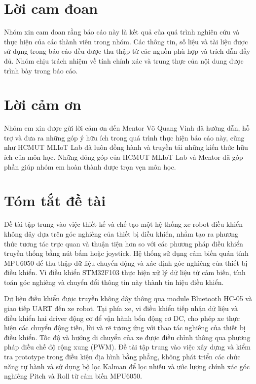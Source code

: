 \let\temp\cleardoublepage
\renewcommand{\cleardoublepage}{\clearpage}
{}
\chapter*{Lời cam đoan}

Nhóm xin cam đoan rằng báo cáo này là kết quả của quá trình nghiên cứu và thực hiện của các thành viên trong nhóm. Các thông tin, số liệu và tài liệu được sử dụng trong báo cáo đều được thu thập từ các nguồn phù hợp và trích dẫn đầy đủ. Nhóm chịu trách nhiệm về tính chính xác và trung thực của nội dung được trình bày trong báo cáo.

{}
\chapter*{Lời cảm ơn}

Nhóm em xin được gửi lời cảm ơn đến Mentor Võ Quang Vinh đã hướng dẫn, hỗ trợ và đưa ra những góp ý hữu ích trong quá trình thực hiện báo cáo này, cũng như HCMUT MLIoT Lab đã luôn đồng hành và truyền tải những kiến thức hữu ích của môn học. Những đóng góp của HCMUT MLIoT Lab và Mentor đã góp phần giúp nhóm em hoàn thành được trọn vẹn môn học.

{}
\chapter*{Tóm tắt đề tài}

Đề tài tập trung vào việc thiết kế và chế tạo một hệ thống xe robot điều khiển không dây dựa trên góc nghiêng của thiết bị điều khiển, nhằm tạo ra phương thức tương tác trực quan và thuận tiện hơn so với các phương pháp điều khiển truyền thống bằng nút bấm hoặc joystick. Hệ thống sử dụng cảm biến quán tính MPU6050 để thu thập dữ liệu chuyển động và xác định góc nghiêng của thiết bị điều khiển. Vi điều khiển STM32F103 thực hiện xử lý dữ liệu từ cảm biến, tính toán góc nghiêng và chuyển đổi thông tin này thành tín hiệu điều khiển.

Dữ liệu điều khiển được truyền không dây thông qua module Bluetooth HC-05 và giao tiếp UART đến xe robot. Tại phía xe, vi điều khiển tiếp nhận dữ liệu và điều khiển hai driver động cơ để vận hành bốn động cơ DC, cho phép xe thực hiện các chuyển động tiến, lùi và rẽ tương ứng với thao tác nghiêng của thiết bị điều khiển. Tốc độ và hướng di chuyển của xe được điều chỉnh thông qua phương pháp điều chế độ rộng xung (PWM). Đề tài tập trung vào việc xây dựng và kiểm tra prototype trong điều kiện địa hình bằng phẳng, không phát triển các chức năng tự hành và sử dụng bộ lọc Kalman để lọc nhiễu và ước lượng chính xác góc nghiêng Pitch và Roll từ cảm biến MPU6050.

